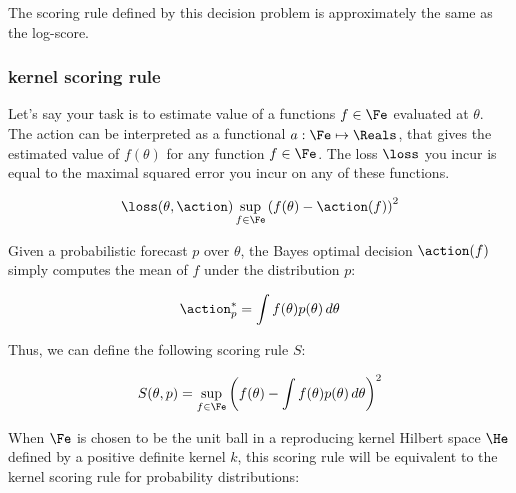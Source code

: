 The scoring rule defined by this decision problem is approximately the same as the log-score.

\subsubsection{kernel scoring rule}

Let's say your task is to estimate value of a functions $f\in{\Fe}$ evaluated at $\theta$. The action can be interpreted as a functional $a:\Fe\mapsto\Reals$, that gives the estimated value of $f(\theta)$ for any function $f\in\Fe$. The loss $\loss$ you incur is equal to the maximal squared error you incur on any of these functions.

\begin{equation}
\loss(\theta, \action) \sup_{f\in\Fe}\left( f(\theta) - \action(f)\right)^2
\end{equation}

Given a probabilistic forecast $p$ over $\theta$, the Bayes optimal decision $\action(f)$ simply computes the mean of $f$ under the distribution $p$:

\begin{equation}
 \action^{*}_{p} = \int f(\theta)p(\theta)\,d\theta
\end{equation}

Thus, we can define the following scoring rule $S$:

\begin{equation}
	S(\theta,p) = \sup_{f\in\Fe}\left( f(\theta) - \int f(\theta)p(\theta)\,d\theta \right)^2
\end{equation}

When $\Fe$ is chosen to be the unit ball in a reproducing kernel Hilbert space $\He$ defined by a positive definite kernel $k$, this scoring rule will be equivalent to the kernel scoring rule for probability distributions:

